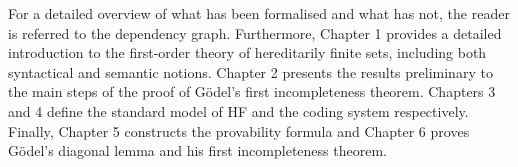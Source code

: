 For a detailed overview of what has been formalised and what has not, 
the reader is referred to the dependency graph.
Furthermore, 
Chapter 1 provides a detailed introduction to the first-order theory of hereditarily finite sets,
including both syntactical and semantic notions.
Chapter 2 presents the results preliminary to the main steps of the proof of Gödel's first
incompleteness theorem.
Chapters 3 and 4 define the standard model of HF and the coding system respectively.
Finally, Chapter 5 constructs the provability formula and Chapter 6
proves Gödel's diagonal lemma and his first incompleteness theorem.






